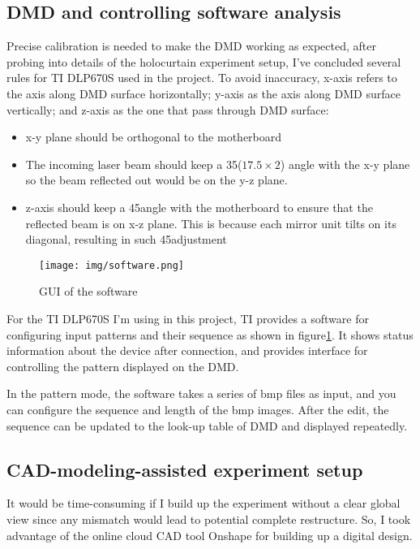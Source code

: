 \documentclass[10pt,journal,compsoc]{IEEEtran}
\begin{document}
\subsection{DMD and controlling software analysis}
\label{sec:3.2}
Precise calibration is needed to make the DMD working as expected, after probing into details of the holocurtain experiment setup, I've concluded several rules for TI DLP670S used in the project. To avoid inaccuracy, x-axis refers to the axis along DMD surface horizontally; y-axis as the axis along DMD surface vertically; and z-axis as the one that pass through DMD surface:
\begin{itemize}
    \item x-y plane should be orthogonal to the motherboard
    \item The incoming laser beam should keep a 35\textdegree ($17.5 \times 2$\textdegree) angle with the x-y plane so the beam reflected out would be on the y-z plane.
    \item z-axis should keep a 45\textdegree angle with the motherboard to ensure that the reflected beam is on x-z plane. This is because each mirror unit tilts on its diagonal, resulting in such 45\textdegree adjustment
\end{itemize}

\begin{figure}[!h]
    \centering
    \texttt{[image: img/software.png]}
    \caption{GUI of the software}
    \label{fig:fig8}
\end{figure}

For the TI DLP670S I'm using in this project, TI provides a software for configuring input patterns and their sequence as shown in figure\ref{fig:fig8}. It shows status information about the device after connection, and provides interface for controlling the pattern displayed on the DMD.

In the pattern mode, the software takes a series of bmp files as input, and you can configure the sequence and length of the bmp images. After the edit, the sequence can be updated to the look-up table of DMD and displayed repeatedly.

\subsection{CAD-modeling-assisted experiment setup}
\label{sec:3.3}
It would be time-consuming if I build up the experiment without a clear global view since any mismatch would lead to potential complete restructure. So, I took advantage of the online cloud CAD tool Onshape for building up a digital design.
\end{document}
